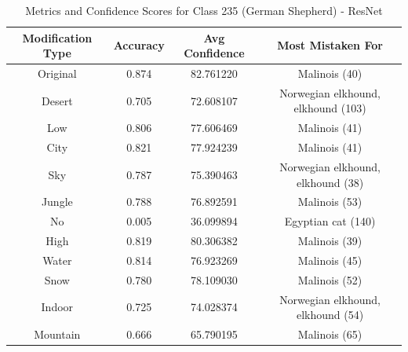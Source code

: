 \begin{table}
	\centering
	\begin{tabular}{|c|c|c|c|}
		\hline
		\textbf{Modification Type} & \textbf{Accuracy} & \textbf{Avg Confidence} & \textbf{Most Mistaken For} \\
		\hline
		Original & 0.874 & 82.761220 & Malinois (40) \\
		\hline
		Desert & 0.705 & 72.608107 & Norwegian elkhound, elkhound (103) \\
		\hline
		Low & 0.806 & 77.606469 & Malinois (41) \\
		\hline
		City & 0.821 & 77.924239 & Malinois (41) \\
		\hline
		Sky & 0.787 & 75.390463 & Norwegian elkhound, elkhound (38) \\
		\hline
		Jungle & 0.788 & 76.892591 & Malinois (53) \\
		\hline
		No & 0.005 & 36.099894 & Egyptian cat (140) \\
		\hline
		High & 0.819 & 80.306382 & Malinois (39) \\
		\hline
		Water & 0.814 & 76.923269 & Malinois (45) \\
		\hline
		Snow & 0.780 & 78.109030 & Malinois (52) \\
		\hline
		Indoor & 0.725 & 74.028374 & Norwegian elkhound, elkhound (54) \\
		\hline
		Mountain & 0.666 & 65.790195 & Malinois (65) \\
		\hline
	\end{tabular}
	\caption{Metrics and Confidence Scores for Class 235 (German Shepherd) - ResNet}
	\label{tab:metrics_confidence_class_235_resnet}
\end{table}

